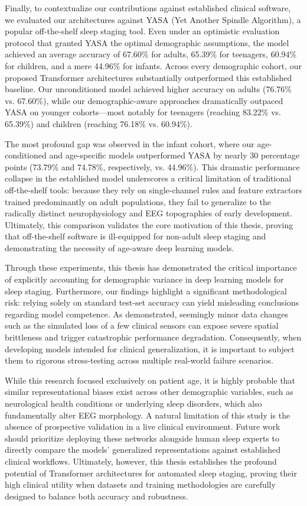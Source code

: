 Finally, to contextualize our contributions against established clinical software,
we evaluated our architectures against YASA (Yet Another Spindle Algorithm),
a popular off-the-shelf sleep staging tool. Even under an optimistic evaluation
protocol that granted YASA the optimal demographic assumptions, the model achieved
an average accuracy of 67.60\% for adults, 65.39\% for teenagers, 60.94\% for children,
and a mere 44.96\% for infants. Across every demographic cohort, our proposed
Transformer architectures substantially outperformed this established baseline.
Our unconditioned model achieved higher accuracy on adults (76.76\% vs. 67.60\%),
while our demographic-aware approaches dramatically outpaced YASA on younger
cohorts—most notably for teenagers (reaching 83.22\% vs. 65.39\%) and children
(reaching 76.18\% vs. 60.94\%).

The most profound gap was observed in the infant cohort, where our age-conditioned
and age-specific models outperformed YASA by nearly 30 percentage points (73.79\%
and 74.78\%, respectively, vs. 44.96\%). This dramatic performance collapse in the
established model underscores a critical limitation of traditional off-the-shelf
tools: because they rely on single-channel rules and feature extractors trained
predominantly on adult populations, they fail to generalize to the radically distinct
neurophysiology and EEG topographies of early development. Ultimately, this comparison
validates the core motivation of this thesis, proving that off-the-shelf software is
ill-equipped for non-adult sleep staging and demonstrating the necessity of age-aware
deep learning models.

Through these experiments, this thesis has demonstrated the critical importance
of explicitly accounting for demographic variance in deep learning models
for sleep staging. Furthermore, our findings highlight a significant
methodological risk: relying solely on standard test-set accuracy can yield
misleading conclusions regarding model competence. As demonstrated, seemingly
minor data changes such as the simulated loss of a few clinical sensors 
can expose severe spatial brittleness and trigger catastrophic 
performance degradation. Consequently, when developing models intended for 
clinical generalization, it is important to subject them to rigorous 
stress-testing across multiple real-world failure scenarios.

While this research focused exclusively on patient age, it is highly probable
that similar representational biases exist across other demographic variables,
such as neurological health conditions or underlying sleep disorders,
which also fundamentally alter EEG morphology. A natural limitation of
this study is the absence of prospective validation in a live clinical
environment. Future work should prioritize deploying these networks alongside
human sleep experts to directly compare the models' generalized representations
against established clinical workflows. Ultimately, however, this thesis
establishes the profound potential of Transformer architectures for
automated sleep staging, proving their high clinical utility when datasets
and training methodologies are carefully designed to balance both accuracy and robustness.